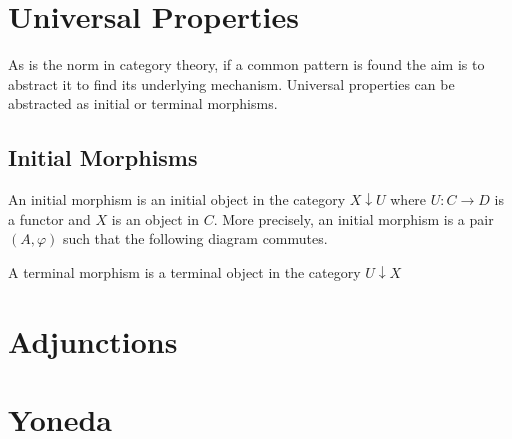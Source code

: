 \documentclass[a4paper,10pt]{article}
\begin{document}
\section{Universal Properties}
As is the norm in category theory, if a common pattern is found the aim is to
abstract it to find its underlying mechanism. Universal properties can
be abstracted as initial or terminal morphisms.

\subsection{Initial Morphisms}
An initial morphism is an initial object in the category $X \downarrow U$ where
$U : C \rightarrow D$ is a functor and $X$ is an object in $C$. More precisely,
an initial morphism is a pair $(A, \varphi)$ such that the following diagram
commutes.

A terminal morphism is a terminal object in the category $U \downarrow X$


\section{Adjunctions}
\section{Yoneda}
\end{document}
